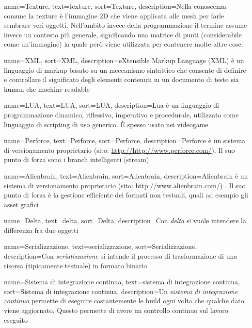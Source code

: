 {
	name=Texture,
	text=texture,
	sort=Texture,
	description={Nella conoscenza comune la texture è l'immagine 2D che viene applicata alle mesh per farle sembrare veri oggetti. Nell'ambito invece della programmazione il termine assume invece un contesto più generale, significando una matrice di punti (considerabile come un'immagine) la quale però viene utilizzata per contenere molte altre cose.
}

{
	name=XML,
	sort=XML,
	description={eXtensible Markup Language (XML) è un linguaggio di markup basato su un meccanismo sintattico che consente di definire e controllare il significato degli elementi contenuti in un documento di testo sia human che machine readable}
}

{
	name=LUA,
	text=LUA,
	sort=LUA,
	description={Lua è un linguaggio di programmazione dinamico, riflessivo, imperativo e procedurale, utilizzato come linguaggio di scripting di uso generico. È spesso usato nei videogame}
}

{
	name=Perforce\textsuperscript{\textregistered},
	text=Perforce\textsuperscript{\textregistered},
	sort=Perforce,
	description={Perforce\textsuperscript{\textregistered} è un sistema di versionamento proprietario (sito: \url{http://http://www.perforce.com/}). Il suo punto di forza sono i branch intelligenti (stream)}
}

{
	name=Alienbrain\textsuperscript{\textregistered},
	text=Alienbrain\textsuperscript{\textregistered},
	sort=Alienbrain,
	description={Alienbrain\textsuperscript{\textregistered} è un sistema di versionamento proprietario (sito: \url{http://www.alienbrain.com/}) . Il suo punto di forza è la gestione efficiente dei formati non testuali, quali ad esempio gli asset grafici}
}

{
	name=Delta,
	text=delta,
	sort=Delta,
	description={Con \emph{delta} si vuole intendere la differenza fra due oggetti}
}

{
	name=Serializzazione,
	text=serializzazione,
	sort=Serializzazione,
	description={Con \emph{serializzazione} si intende il processo di trasformazione di una risorsa (tipicamente testuale) in formato binario}
}

{
	name=Sistema di integrazione continua,
	text=sistema di integrazione continua,
	sort=Sistema di integrazione continua,
	description={Un \emph{sistema di integrazione continua} permette di eseguire costantemente le build ogni volta che qualche dato viene aggiornato. Questo permette di avere un controllo continuo sul lavoro eseguito}
}

}
